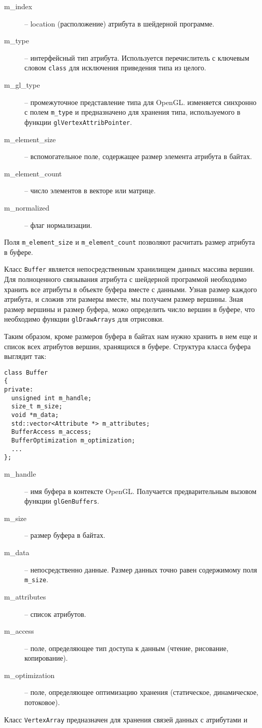 \documentclass[a4paper, 12pt]{article}
\begin{document}
\begin{description}
      \item[m\_index] -- location (расположение) атрибута в шейдерной
            программе.
      \item[m\_type] -- интерфейсный тип атрибута. Используется перечислитель
            с ключевым словом \texttt{class} для исключения приведения типа
            из целого.
      \item[m\_gl\_type] -- промежуточное представление типа для OpenGL.
            изменяется синхронно с полем \texttt{m\_type} и предназначено для
            хранения типа, используемого в функции
            \texttt{glVertexAttribPointer}.
      \item[m\_element\_size] -- вспомогательное поле, содержащее размер
            элемента атрибута в байтах.
      \item[m\_element\_count] -- число элементов в векторе или матрице.
      \item[m\_normalized] -- флаг нормализации.
\end{description}

Поля \texttt{m\_element\_size} и \texttt{m\_element\_count} позволяют расчитать
размер атрибута в буфере.

Класс \texttt{Buffer} является непосредственным хранилищем данных массива
вершин. Для полноценного связывания атрибута с шейдерной программой необходимо
хранить все атрибуты в объекте буфера вместе с данными. Узнав размер каждого
атрибута, и сложив эти размеры вместе, мы получаем размер вершины. Зная размер
вершины и размер буфера, можо определить число вершин в буфере, что необходимо
функции \texttt{glDrawArrays} для отрисовки.

Таким образом, кроме размеров буфера в байтах нам нужно хранить в нем еще и
список всех атрибутов вершин, хранящихся в буфере. Структура класса буфера
выглядит так:

\begin{verbatim}
class Buffer
{
private:
  unsigned int m_handle;
  size_t m_size;
  void *m_data;
  std::vector<Attribute *> m_attributes;
  BufferAccess m_access;
  BufferOptimization m_optimization;
  ...
};
\end{verbatim}

\begin{description}
      \item[m\_handle] -- имя буфера в контексте OpenGL. Получается
            предварительным вызовом функции \texttt{glGenBuffers}.
      \item[m\_size] -- размер буфера в байтах.
      \item[m\_data] -- непосредственно данные. Размер данных точно равен
            содержимому поля \texttt{m\_size}.
      \item[m\_attributes] -- список атрибутов.
      \item[m\_access] -- поле, определяющее тип доступа к данным (чтение,
            рисование, копирование).
      \item[m\_optimization] -- поле, определяющее оптимизацию хранения
      (статическое, динамическое, потоковое).
\end{description}

Класс \texttt{VertexArray} предназначен для хранения связей данных с атрибутами
и 
\end{document}
